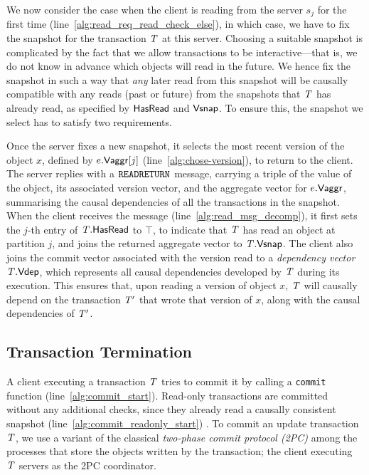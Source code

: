 We now consider the case when the client is reading from the server $s_j$ for the first time (line~\ref{alg:read_req_read_check_else}), in which case, we have to fix the snapshot for the transaction $\mathit{T}$ at this server. Choosing a suitable snapshot is complicated by the fact that we allow transactions to be interactive---that is, we do not know in advance which objects will read in the future. We hence fix the snapshot in such a way that \emph{any} later read from this snapshot will be causally  compatible with any reads (past or future) from the snapshots that $\mathit{T}$ has already read, as specified by $\mathsf{HasRead}$ and $\mathsf{Vsnap}$. To ensure this, the snapshot we select has to satisfy two requirements.


Once the server fixes a new snapshot, it selects the most recent version of the object $x$, defined by $e.\mathsf{Vaggr}[j]$ (line~\ref{alg:chose-version}), to return to the client. The server replies with a ${\tt READRETURN}$ message, carrying a triple of the value of the object, its associated version vector, and the aggregate vector for $e.\mathsf{Vaggr}$, summarising the causal  dependencies of all the transactions in the snapshot. When the client receives the message (line~\ref{alg:read_msg_decomp}), it first sets the $j$-th entry of $\mathit{T}.\mathsf{HasRead}$ to $\top$, to indicate that $\mathit{T}$ has read an object at partition $j$, and joins the returned aggregate vector to $\mathit{T}.\mathsf{Vsnap}$. The client also joins the commit vector associated with the version read to a \emph{dependency vector} $\mathit{T}.\mathsf{Vdep}$, which represents all causal  dependencies developed by $\mathit{T}$ during its execution. This ensures that, upon reading a version of object $x$, $\mathit{T}$ will causally depend  on the transaction $\mathit{T}'$ that wrote that version of $x$, along with the causal dependencies of $\mathit{T}'$.


\subsection{Transaction Termination}

A client executing a transaction $\mathit{T}$ tries to commit it by calling a {\tt commit} function (line~\ref{alg:commit_start}). Read-only transactions are committed without any additional checks, since they already read a causally consistent snapshot (line~\ref{alg:commit_readonly_start}) . To commit an update transaction $\mathit{T}$, we use a variant of the classical \emph{two-phase commit protocol (2PC)}  among the processes that store the objects written by the transaction; the client executing $\mathit{T}$ servers as the 2PC coordinator.

